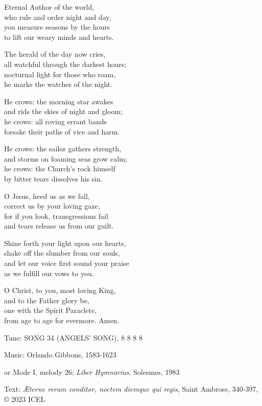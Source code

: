 \hymn

\begin{hymnverse}
Eternal Author of the world,\\
who rule and order night and day,\\
you measure seasons by the hours\\
to lift our weary minds and hearts.

The herald of the day now cries,\\
all watchful through the darkest hours;\\
nocturnal light for those who roam,\\
he marks the watches of the night.

He crows: the morning star awakes\\
and rids the skies of night and gloom;\\
he crows: all roving errant bands\\
forsake their paths of vice and harm.

He crows: the sailor gathers strength,\\
and storms on foaming seas grow calm;\\
he crows: the Church’s rock himself\\
by bitter tears dissolves his sin.

O Jesus, heed us as we fall,\\
correct us by your loving gaze,\\
for if you look, transgressions fail\\
and tears release us from our guilt.

Shine forth your light upon our hearts,\\
shake off the slumber from our souls,\\
and let our voice first sound your praise\\
as we fulfill our vows to you.

O Christ, to you, most loving King,\\
and to the Father glory be,\\
one with the Spirit Paraclete,\\
from age to age for evermore. Amen.
\end{hymnverse}

\begin{hymnsource}
Tune: SONG 34 (ANGELS’ SONG), 8 8 8 8

Music: Orlando Gibbons, 1583-1623

or Mode I, melody 26; \emph{Liber Hymnarius}, Solesmes, 1983

Text: \emph{Æterne rerum conditor, noctem diemque qui regis}, Saint Ambrose, 340-397, © 2023 ICEL
\end{hymnsource}